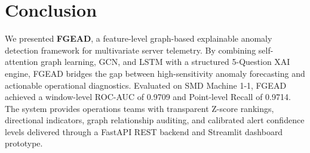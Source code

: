 \documentclass[conference]{IEEEtran}
\begin{document}
\section{Conclusion}
We presented \textbf{FGEAD}, a feature-level graph-based explainable anomaly detection framework for multivariate server telemetry. By combining self-attention graph learning, GCN, and LSTM with a structured 5-Question XAI engine, FGEAD bridges the gap between high-sensitivity anomaly forecasting and actionable operational diagnostics. Evaluated on SMD Machine 1-1, FGEAD achieved a window-level ROC-AUC of 0.9709 and Point-level Recall of 0.9714. The system provides operations teams with transparent Z-score rankings, directional indicators, graph relationship auditing, and calibrated alert confidence levels delivered through a FastAPI REST backend and Streamlit dashboard prototype.



\end{document}

